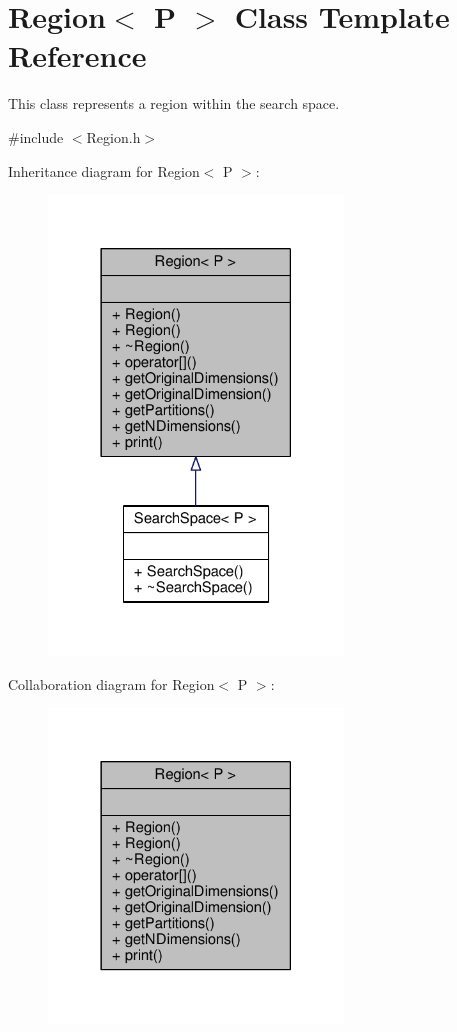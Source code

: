 \hypertarget{classRegion}{}\section{Region$<$ P $>$ Class Template Reference}
\label{classRegion}


This class represents a region within the search space.  




{\ttfamily \#include $<$Region.\+h$>$}



Inheritance diagram for Region$<$ P $>$\+:\nopagebreak
\begin{figure}[H]
\begin{center}
\leavevmode
\includegraphics[width=222pt]{classRegion__inherit__graph}
\end{center}
\end{figure}


Collaboration diagram for Region$<$ P $>$\+:\nopagebreak
\begin{figure}[H]
\begin{center}
\leavevmode
\includegraphics[width=222pt]{classRegion__coll__graph}
\end{center}
\end{figure}
